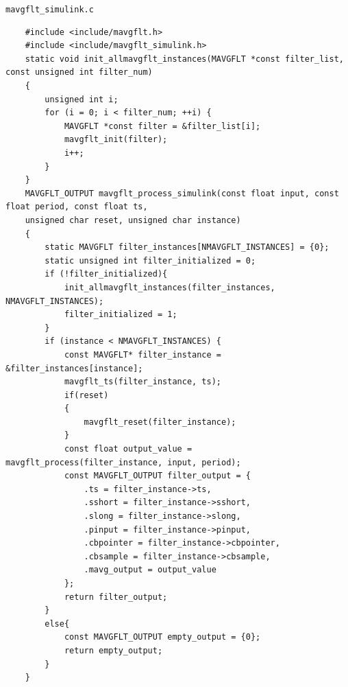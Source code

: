 \documentclass[11pt,a4paper,oneside]{book}
\numberwithin{equation}{section}
\theoremstyle{it}
\theoremstyle{definition}
\begin{document}
\begin{mybox}
\begin{center}
	{\selectfont \verb+mavgflt_simulink.c+}
\end{center}
{\selectfont \footnotesize \noindent
	\begin{verbatim}
	#include <include/mavgflt.h>
	#include <include/mavgflt_simulink.h>
	static void init_allmavgflt_instances(MAVGFLT *const filter_list, const unsigned int filter_num)
	{
	    unsigned int i;
	    for (i = 0; i < filter_num; ++i) {
	        MAVGFLT *const filter = &filter_list[i];
	        mavgflt_init(filter);
            i++;
	    }
	}
	MAVGFLT_OUTPUT mavgflt_process_simulink(const float input, const float period, const float ts, 
	unsigned char reset, unsigned char instance)
	{
	    static MAVGFLT filter_instances[NMAVGFLT_INSTANCES] = {0};
	    static unsigned int filter_initialized = 0;
	    if (!filter_initialized){
	        init_allmavgflt_instances(filter_instances, NMAVGFLT_INSTANCES);
            filter_initialized = 1;
		}
		if (instance < NMAVGFLT_INSTANCES) {
		    const MAVGFLT* filter_instance = &filter_instances[instance];
		    mavgflt_ts(filter_instance, ts);
		    if(reset)
		    {
		        mavgflt_reset(filter_instance);
		    }
		    const float output_value = mavgflt_process(filter_instance, input, period);
		    const MAVGFLT_OUTPUT filter_output = {
		        .ts = filter_instance->ts,
		        .sshort = filter_instance->sshort,
		        .slong = filter_instance->slong,
		        .pinput = filter_instance->pinput,
		        .cbpointer = filter_instance->cbpointer,
		        .cbsample = filter_instance->cbsample,
		        .mavg_output = output_value
		    };
		    return filter_output;
		}
		else{
		    const MAVGFLT_OUTPUT empty_output = {0};
	        return empty_output;
	    }
	}
	\end{verbatim}}
\end{mybox}
\end{document}
